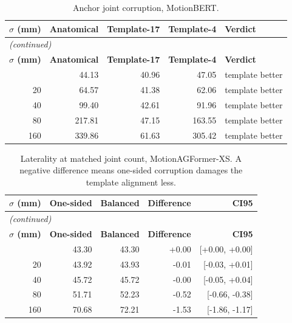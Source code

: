 \vspace{0.6cm}

\begin{center}
{\fontsize{10}{12}\selectfont
\begin{longtable}{rrrrl}
\caption{Anchor joint corruption, MotionBERT.}\label{tab:appanchor_corruption_motionbert}\\
\hline
\textbf{$\sigma$ (mm)} & \textbf{Anatomical} & \textbf{Template-17} & \textbf{Template-4} & \textbf{Verdict} \\
\hline
\endfirsthead
\multicolumn{5}{l}{\textit{(continued)}}\\
\hline
\textbf{$\sigma$ (mm)} & \textbf{Anatomical} & \textbf{Template-17} & \textbf{Template-4} & \textbf{Verdict} \\
\hline
\endhead
\hline
\endfoot
0 & 44.13 & 40.96 & 47.05 & template better \\
20 & 64.57 & 41.38 & 62.06 & template better \\
40 & 99.40 & 42.61 & 91.96 & template better \\
80 & 217.81 & 47.15 & 163.55 & template better \\
160 & 339.86 & 61.63 & 305.42 & template better \\
\end{longtable}
}
\end{center}

\vspace{0.6cm}

\begin{center}
{\fontsize{10}{12}\selectfont
\begin{longtable}{rrrrr}
\caption{Laterality at matched joint count, MotionAGFormer-XS. A negative difference means one-sided corruption damages the template alignment less.}\label{tab:applaterality_xs}\\
\hline
\textbf{$\sigma$ (mm)} & \textbf{One-sided} & \textbf{Balanced} & \textbf{Difference} & \textbf{CI95} \\
\hline
\endfirsthead
\multicolumn{5}{l}{\textit{(continued)}}\\
\hline
\textbf{$\sigma$ (mm)} & \textbf{One-sided} & \textbf{Balanced} & \textbf{Difference} & \textbf{CI95} \\
\hline
\endhead
\hline
\endfoot
0 & 43.30 & 43.30 & +0.00 & [+0.00, +0.00] \\
20 & 43.92 & 43.93 & -0.01 & [-0.03, +0.01] \\
40 & 45.72 & 45.72 & -0.00 & [-0.05, +0.04] \\
80 & 51.71 & 52.23 & -0.52 & [-0.66, -0.38] \\
160 & 70.68 & 72.21 & -1.53 & [-1.86, -1.17] \\
\end{longtable}
}
\end{center}

